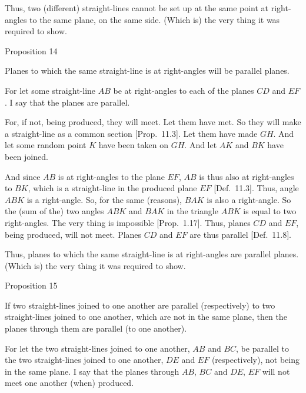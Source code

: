 Thus, two (different) straight-lines cannot be set up at the same point at right-angles to the same plane, on the same side. (Which is) the very thing it was required to show.


\begin{center}
{\large Proposition 14}
\end{center}

Planes to which the same straight-line
is at right-angles will be  parallel planes.

For let some straight-line $AB$ be at right-angles to each of the planes
$CD$ and $EF$. I say that the planes are parallel.

\centerline{}

For, if not, being produced, they will meet. Let them have
met. So they will make a straight-line as a common section [Prop.~11.3]. Let them have made $GH$. And let some
random point $K$ have been taken on $GH$. And let $AK$ and
$BK$ have been joined.

And since $AB$ is at right-angles to the plane $EF$, $AB$ is thus also
at right-angles to  $BK$, which is a straight-line in the produced plane $EF$ [Def.~11.3]. 
Thus, angle $ABK$ is a right-angle.
So, for the same (reasons), $BAK$ is also a right-angle. So the (sum of the)
two angles $ABK$ and $BAK$ in the triangle $ABK$ is equal to
two right-angles. The very thing is impossible [Prop.~1.17]. Thus, planes $CD$ and $EF$, being produced, will not meet.
Planes $CD$ and $EF$ are thus parallel [Def.~11.8].

Thus, planes to which the same straight-line
is at right-angles are  parallel planes. (Which is) the very thing it was required to show.


\begin{center}
{\large Proposition 15}
\end{center}

If two straight-lines joined to one another
are parallel (respectively) to two straight-lines joined to one another, which
are not in the same plane,
then the planes through them are parallel (to one another).

For let the two straight-lines joined to one another, $AB$ and $BC$, be parallel to the two straight-lines joined to one another, $DE$ and $EF$ (respectively), not being in the same plane. I say that the planes
through $AB$, $BC$ and $DE$, $EF$ will not meet one another (when) produced.

